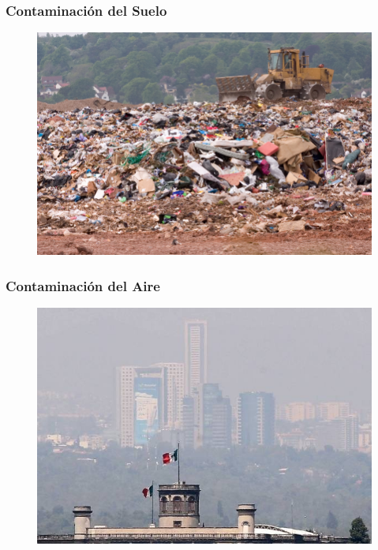 \documentclass[14pt]{beamer}
\begin{document}
\begin{frame}
\frametitle{Contaminación del Suelo}
\vspace*{-1cm}
\begin{figure}
    \centering
    \includegraphics[scale=1]{Imagenes/Contaminacion_03.jpg}
\end{figure}
\end{frame}
\begin{frame}
\frametitle{Contaminación del Aire}
\vspace*{-1cm}
\begin{figure}
    \centering
    \includegraphics[scale=0.6]{Imagenes/Contaminacion_04.jpg}
\end{figure}
\end{frame}
\end{document}
